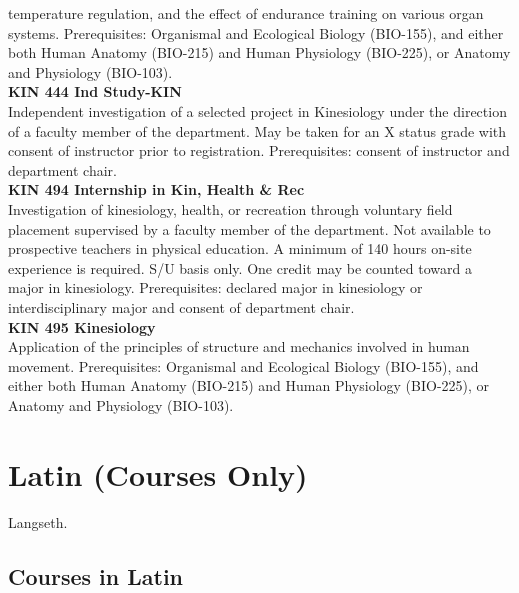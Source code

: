 \documentclass[
  letterpaper,
]{scrbook}
\begin{document}
temperature regulation, and the effect of endurance training on various
organ systems. Prerequisites: Organismal and Ecological Biology
(BIO-155), and either both Human Anatomy (BIO-215) and Human Physiology
(BIO-225), or Anatomy and Physiology (BIO-103).\\
\textbf{KIN 444 Ind Study-KIN}\\
Independent investigation of a selected project in Kinesiology under the
direction of a faculty member of the department. May be taken for an X
status grade with consent of instructor prior to registration.
Prerequisites: consent of instructor and department chair.\\
\textbf{KIN 494 Internship in Kin, Health \& Rec}\\
Investigation of kinesiology, health, or recreation through voluntary
field placement supervised by a faculty member of the department. Not
available to prospective teachers in physical education. A minimum of
140 hours on-site experience is required. S/U basis only. One credit may
be counted toward a major in kinesiology. Prerequisites: declared major
in kinesiology or interdisciplinary major and consent of department
chair.\\
\textbf{KIN 495 Kinesiology}\\
Application of the principles of structure and mechanics involved in
human movement. Prerequisites: Organismal and Ecological Biology
(BIO-155), and either both Human Anatomy (BIO-215) and Human Physiology
(BIO-225), or Anatomy and Physiology (BIO-103).

\section{Latin (Courses Only)}\label{sec-latin}

Langseth.

\subsection{Courses in Latin}\label{courses-in-latin}
\end{document}
